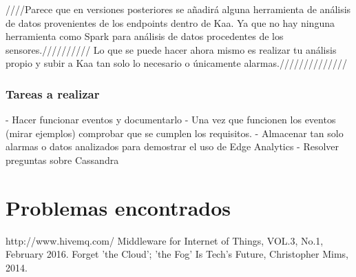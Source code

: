 \documentclass[12pt, twoside]{book}
\begin{document}
////Parece que en versiones posteriores se añadirá alguna herramienta de análisis de datos provenientes de los endpoints dentro de Kaa. Ya que no hay ninguna herramienta como Spark para análisis de datos procedentes de los sensores.////////// Lo que se puede hacer ahora mismo es realizar tu análisis propio y subir a Kaa tan solo lo necesario o únicamente alarmas.//////////////
\subsubsection*{Tareas a realizar}
- Hacer funcionar eventos y documentarlo
- Una vez que funcionen los eventos (mirar ejemplos) comprobar que se cumplen los requisitos.
- Almacenar tan solo alarmas o datos analizados para demostrar el uso de Edge Analytics
- Resolver preguntas sobre Cassandra
\section{Problemas encontrados}
\begin{thebibliography}{X}
 {http://www.hivemq.com/}
 {Middleware for Internet of Things, VOL.3, No.1, February 2016.}
 {Forget 'the Cloud'; 'the Fog' Is Tech's Future, Christopher Mims, 2014.}
\end{thebibliography}
\end{document}
